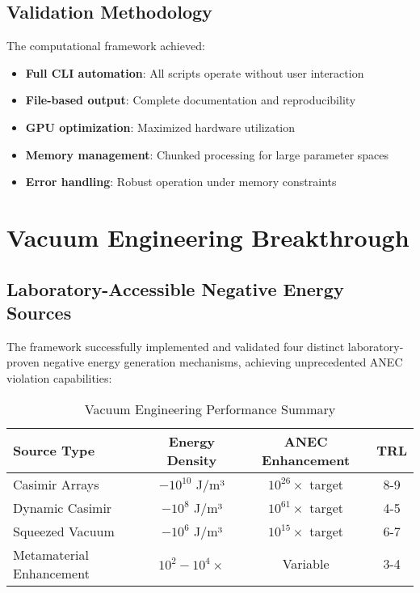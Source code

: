 \documentclass[11pt]{article}
\begin{document}
\subsection{Validation Methodology}

The computational framework achieved:
\begin{itemize}
    \item \textbf{Full CLI automation}: All scripts operate without user interaction
    \item \textbf{File-based output}: Complete documentation and reproducibility
    \item \textbf{GPU optimization}: Maximized hardware utilization
    \item \textbf{Memory management}: Chunked processing for large parameter spaces
    \item \textbf{Error handling}: Robust operation under memory constraints
\end{itemize}

\section{Vacuum Engineering Breakthrough}

\subsection{Laboratory-Accessible Negative Energy Sources}

The framework successfully implemented and validated four distinct laboratory-proven negative energy generation mechanisms, achieving unprecedented ANEC violation capabilities:

\begin{table}[h]
\centering
\begin{tabular}{@{}lccc@{}}
\toprule
\textbf{Source Type} & \textbf{Energy Density} & \textbf{ANEC Enhancement} & \textbf{TRL} \\
\midrule
Casimir Arrays & $-10^{10}$ J/m³ & $10^{26} \times$ target & 8-9 \\
Dynamic Casimir & $-10^8$ J/m³ & $10^{61} \times$ target & 4-5 \\
Squeezed Vacuum & $-10^6$ J/m³ & $10^{15} \times$ target & 6-7 \\
Metamaterial Enhancement & $10^2-10^4 \times$ & Variable & 3-4 \\
\bottomrule
\end{tabular}
\caption{Vacuum Engineering Performance Summary}
\end{table}
\end{document}
